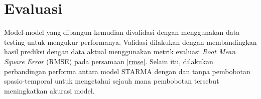 \section{Evaluasi}
Model-model yang dibangun kemudian divalidasi dengan menggunakan data testing untuk mengukur performanya. 
Validasi dilakukan dengan membandingkan hasil prediksi dengan data aktual menggunakan metrik evaluasi \textit{Root Mean Square Error} (RMSE) pada persamaan \ref{rmse}. 
Selain itu, dilakukan perbandingan performa antara model STARMA dengan dan tanpa pembobotan spasio-temporal untuk mengetahui sejauh mana pembobotan tersebut meningkatkan akurasi model.